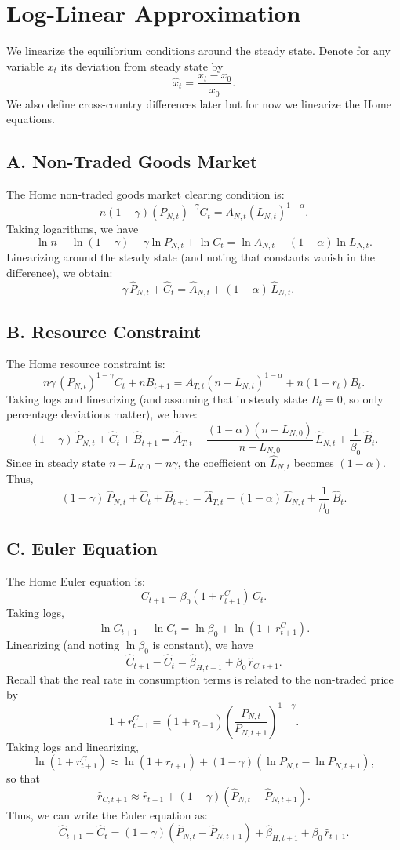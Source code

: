 \documentclass[a4paper,12pt]{article} %
\theoremstyle{nonitalic}
\begin{document}
\section{Log-Linear Approximation}
We linearize the equilibrium conditions around the steady state. Denote for any variable $x_t$ its deviation from steady state by
\[
\hat{x}_t = \frac{x_t-x_0}{x_0}.
\]
We also define cross-country differences later but for now we linearize the Home equations.

\subsection*{A. Non-Traded Goods Market}
The Home non-traded goods market clearing condition is:
\[
n(1-\gamma)(P_{N,t})^{-\gamma}C_t = A_{N,t}(L_{N,t})^{1-\alpha}.
\]
Taking logarithms, we have
\[
\ln n + \ln(1-\gamma) - \gamma\ln P_{N,t} + \ln C_t = \ln A_{N,t} + (1-\alpha)\ln L_{N,t}.
\]
Linearizing around the steady state (and noting that constants vanish in the difference), we obtain:
\[
-\gamma\,\hat{P}_{N,t} + \hat{C}_t = \hat{A}_{N,t} + (1-\alpha)\,\hat{L}_{N,t}.
\]

\subsection*{B. Resource Constraint}
The Home resource constraint is:
\[
n\gamma\,(P_{N,t})^{1-\gamma}C_t + nB_{t+1} = A_{T,t}(n-L_{N,t})^{1-\alpha}+ n(1+r_t)B_t.
\]
Taking logs and linearizing (and assuming that in steady state $B_t=0$, so only percentage deviations matter), we have:
\[
(1-\gamma)\,\hat{P}_{N,t} + \hat{C}_t + \hat{B}_{t+1} = \hat{A}_{T,t} - \frac{(1-\alpha)(n-L_{N,0})}{n-L_{N,0}}\,\hat{L}_{N,t} + \frac{1}{\beta_0}\,\hat{B}_t.
\]
Since in steady state $n-L_{N,0}= n\gamma$, the coefficient on $\hat{L}_{N,t}$ becomes $(1-\alpha)$. Thus,
\[
\boxed{(1-\gamma)\,\hat{P}_{N,t} + \hat{C}_t + \hat{B}_{t+1} = \hat{A}_{T,t} - (1-\alpha)\,\hat{L}_{N,t} + \frac{1}{\beta_0}\,\hat{B}_t. \tag{7b}}
\]

\subsection*{C. Euler Equation}
The Home Euler equation is:
\[
C_{t+1} = \beta_0(1+r_{t+1}^C)\,C_t.
\]
Taking logs,
\[
\ln C_{t+1} - \ln C_t = \ln \beta_0 + \ln(1+r_{t+1}^C).
\]
Linearizing (and noting $\ln\beta_0$ is constant), we have
\[
\hat{C}_{t+1}-\hat{C}_t = \hat{\beta}_{H,t+1} + \beta_0\,\hat{r}_{C,t+1}.
\]
Recall that the real rate in consumption terms is related to the non-traded price by
\[
1+r_{t+1}^C = (1+r_{t+1})\left(\frac{P_{N,t}}{P_{N,t+1}}\right)^{1-\gamma}.
\]
Taking logs and linearizing,
\[
\ln(1+r_{t+1}^C) \approx \ln(1+r_{t+1}) + (1-\gamma)(\ln P_{N,t}-\ln P_{N,t+1}),
\]
so that
\[
\hat{r}_{C,t+1} \approx \hat{r}_{t+1} + (1-\gamma)(\hat{P}_{N,t}-\hat{P}_{N,t+1}).
\]
Thus, we can write the Euler equation as:
\[
\boxed{\hat{C}_{t+1}-\hat{C}_t = (1-\gamma)(\hat{P}_{N,t}-\hat{P}_{N,t+1}) + \hat{\beta}_{H,t+1} + \beta_0\,\hat{r}_{t+1}. \tag{7c}}
\]
\end{document}
